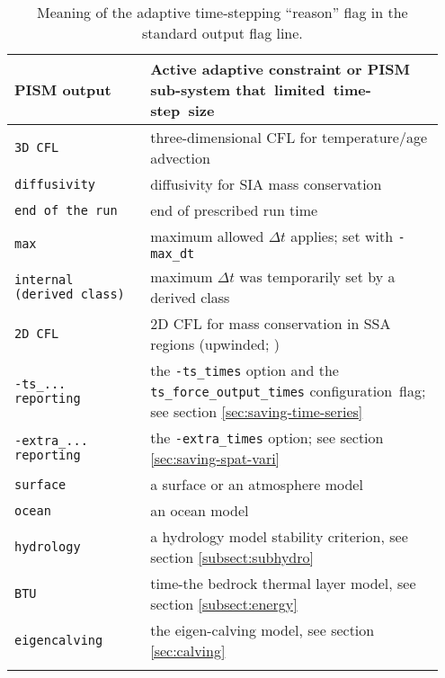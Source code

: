 \begin{table}[ht]
\centering
\begin{tabular}{p{0.3\linewidth}p{0.65\linewidth}}\toprule
  \textbf{PISM output} & \textbf{Active adaptive constraint or PISM sub-system \mbox{that limited time-step size}} \\ \midrule
  \texttt{3D CFL} & three-dimensional CFL for temperature/age advection \cite{BBL} \\
  \texttt{diffusivity} & diffusivity for SIA mass conservation \cite{BBL,HindmarshPayne} \\
  \texttt{end of the run} & end of prescribed run time \\
  \texttt{max} & maximum allowed $\Delta t$ applies; set with \texttt{-max_dt} \\
  \texttt{internal (derived class)} & maximum $\Delta t$ was temporarily set by a derived class \\
  \texttt{2D CFL} & 2D CFL for mass conservation in SSA regions (upwinded; \cite{BBssasliding})\\
  \texttt{-ts_... reporting} & the \texttt{-ts_times} option and the \mbox{\texttt{ts_force_output_times}} \mbox{configuration flag}; see section \ref{sec:saving-time-series} \\
  \texttt{-extra_... reporting} & the \texttt{-extra_times} option; see section \ref{sec:saving-spat-vari} \\
  \texttt{surface} & a surface or an atmosphere model \\
  \texttt{ocean} & an ocean model \\
  \texttt{hydrology} & a hydrology model stability criterion, see section \ref{subsect:subhydro} \\
  \texttt{BTU} & time-the bedrock thermal layer model, see section \ref{subsect:energy} \\
  \texttt{eigencalving} & the eigen-calving model, see section \ref{sec:calving} \\
  
  \bottomrule
  \normalsize
\end{tabular}
\caption{Meaning of the adaptive time-stepping ``reason'' flag in the standard output flag line.}
\label{tab:adaptiveflag}
\end{table}

